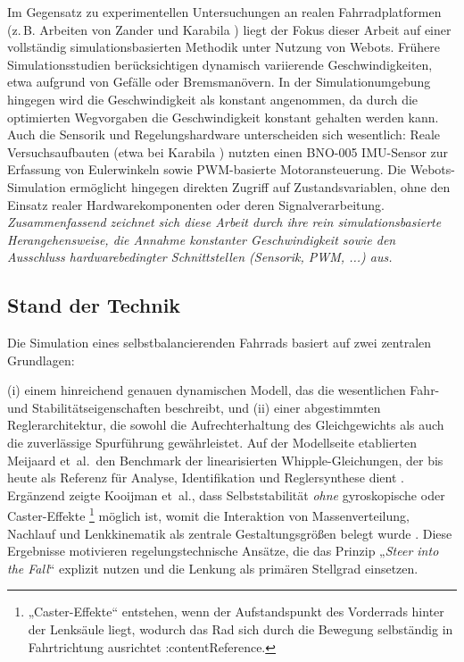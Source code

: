 Im Gegensatz zu experimentellen Untersuchungen an realen Fahrradplatformen (z.\,B. Arbeiten von Zander \citep{zander2023} und Karabila \citep{karabila2022}) 
liegt der Fokus dieser Arbeit auf einer vollständig simulationsbasierten Methodik unter Nutzung von Webots.
Frühere Simulationsstudien berücksichtigen dynamisch variierende Geschwindigkeiten, etwa 
aufgrund von Gefälle oder Bremsmanövern. In der Simulationumgebung hingegen wird die Geschwindigkeit als konstant angenommen, da durch 
die optimierten Wegvorgaben die Geschwindigkeit konstant gehalten werden kann. Auch die Sensorik und Regelungshardware unterscheiden sich wesentlich: Reale Versuchsaufbauten (etwa bei Karabila \citep{karabila2022}) nutzten einen BNO-005 IMU-Sensor zur 
Erfassung von Eulerwinkeln sowie PWM-basierte Motoransteuerung. Die Webots-Simulation ermöglicht hingegen direkten Zugriff 
auf Zustandsvariablen, ohne den Einsatz realer Hardwarekomponenten oder deren Signalverarbeitung.
\emph{Zusammenfassend zeichnet sich diese Arbeit durch ihre rein simulationsbasierte Herangehensweise, die Annahme konstanter Geschwindigkeit sowie den Ausschluss hardwarebedingter Schnittstellen (Sensorik, PWM, ...) aus.}












  
\subsection{Stand der Technik}


Die Simulation eines selbstbalancierenden Fahrrads basiert auf zwei zentralen Grundlagen: 

(i) einem hinreichend genauen dynamischen Modell, das die wesentlichen Fahr- und \newline
Stabilitätseigenschaften beschreibt, und \newline
(ii) einer abgestimmten Reglerarchitektur, die sowohl die Aufrechterhaltung des Gleichgewichts als auch die zuverlässige Spurführung gewährleistet.  \newline \newline
Auf der Modellseite etablierten Meijaard et~al.\ den Benchmark der linearisierten Whipple-Gleichungen, der bis 
heute als Referenz für Analyse, Identifikation und Reglersynthese dient \citep{meijaard2007}. Ergänzend zeigte Kooijman et~al., dass Selbststabilität 
\emph{ohne} gyroskopische oder Caster-Effekte \footnote{„Caster-Effekte“ entstehen, wenn der Aufstandspunkt des Vorderrads hinter der Lenksäule liegt,
wodurch das Rad sich durch die Bewegung selbständig in Fahrtrichtung ausrichtet :contentReference.} möglich ist, womit die Interaktion
von Massenverteilung, Nachlauf und Lenkkinematik als zentrale Gestaltungsgrößen belegt wurde \citep{kooijman2011}. Diese Ergebnisse motivieren 
regelungstechnische Ansätze, die das Prinzip „\emph{Steer into the Fall}“ explizit nutzen und die Lenkung als primären Stellgrad einsetzen.

